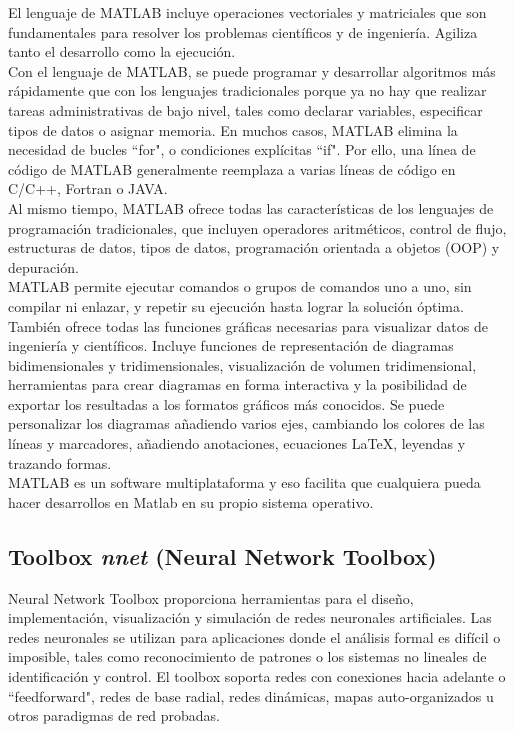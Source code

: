		El lenguaje de MATLAB incluye operaciones vectoriales y matriciales que son fundamentales para resolver los problemas científicos y de ingeniería. Agiliza tanto el desarrollo como la ejecución.\\

		Con el lenguaje de MATLAB, se puede programar y desarrollar algoritmos más rápidamente que con los lenguajes tradicionales porque ya no hay que realizar tareas administrativas de bajo nivel, tales como declarar variables, especificar tipos de datos o asignar memoria. En muchos casos, MATLAB elimina la necesidad de bucles ``for", o condiciones explícitas ``if". Por ello, una línea de código de MATLAB generalmente reemplaza a varias líneas de código en C/C++, Fortran o JAVA.\\

		Al mismo tiempo, MATLAB ofrece todas las características de los lenguajes de programación tradicionales, que incluyen operadores aritméticos, control de flujo, estructuras de datos, tipos de datos, programación orientada a objetos (OOP) y depuración.\\
		
		MATLAB permite ejecutar comandos o grupos de comandos uno a uno, sin compilar ni enlazar, y repetir su ejecución hasta lograr la solución óptima.\\
		
		También ofrece todas las funciones gráficas necesarias para visualizar datos de ingeniería y científicos. Incluye funciones de representación de diagramas bidimensionales y tridimensionales, visualización de volumen tridimensional, herramientas para crear diagramas en forma interactiva y la posibilidad de exportar los resultadas a los formatos gráficos más conocidos. Se puede personalizar los diagramas añadiendo varios ejes, cambiando los colores de las líneas y marcadores, añadiendo anotaciones, ecuaciones LaTeX, leyendas y trazando formas.\\
		
		MATLAB es un software multiplataforma y eso facilita que cualquiera pueda hacer desarrollos en Matlab en su propio sistema operativo.
	
		\subsection{Toolbox \textit{nnet} (Neural Network Toolbox)}
		
			Neural Network Toolbox proporciona herramientas para el diseño, implementación, visualización y simulación de redes neuronales artificiales. Las redes neuronales se utilizan para aplicaciones donde el análisis formal es difícil o imposible, tales como reconocimiento de patrones o los sistemas no lineales de identificación y control. El toolbox soporta redes con conexiones hacia adelante o ``feedforward", redes de base radial, redes dinámicas, mapas auto-organizados u otros paradigmas de red probadas.\\

